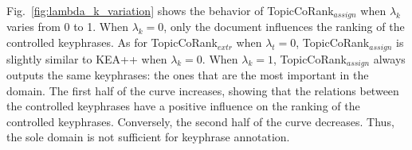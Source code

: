         Fig.~\ref{fig:lambda_k_variation} shows the behavior of TopicCo\-Rank$_\textit{assign}$ when $\lambda_k$ varies from 0 to 1.
        When $\lambda_k = 0$, only the document influences the ranking of the controlled keyphrases.
        As for TopicCoRank$_\textit{extr}$ when $\lambda_t = 0$, TopicCoRank$_\textit{assign}$ is slightly similar to KEA++ when $\lambda_k = 0$.
        When $\lambda_k = 1$, TopicCoRank$_\textit{assign}$ always outputs the same keyphrases: the ones that are the most important in the domain.
        The first half of the curve increases, showing that the relations between the controlled keyphrases have a positive influence on the ranking of the controlled keyphrases.
        Conversely, the second half of the curve decreases.
        Thus, the sole domain is not sufficient for keyphrase annotation.
        
        
